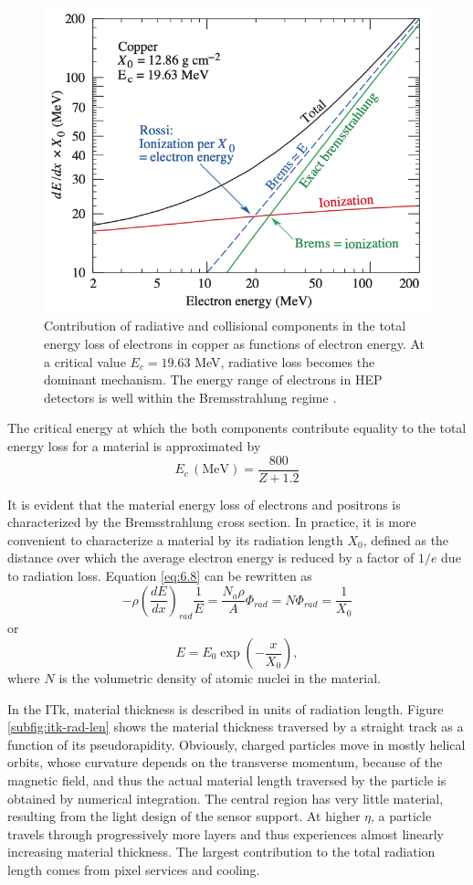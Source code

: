 \begin{figure}[h!]
    \centering
    \includegraphics[width=0.65\linewidth]{figures/rad-vs-col.png}
    \caption{Contribution of radiative and collisional components in the total energy loss of electrons in copper as functions of electron energy. At a critical value $E_c=19.63$ MeV, radiative loss becomes the dominant mechanism. The energy range of electrons in HEP detectors is well within the Bremsstrahlung regime \cite{Zyla:2020zbs}.}
    \label{fig:rad-vs-col}
\end{figure}
The critical energy at which the both components contribute equality to the total energy loss for a material is approximated by 
\begin{equation}
    \label{eq:6.10}
    E_c \,(\mathrm{MeV}) = \frac{800}{Z+1.2}
\end{equation}

It is evident that the material energy loss of electrons and positrons is characterized by the Bremsstrahlung cross section. 
In practice, it is more convenient to characterize a material by its radiation length $X_0$, defined as the distance over which the average electron energy is reduced by a factor of $1/e$ due to radiation loss. 
Equation \eqref{eq:6.8} can be rewritten as 
\begin{equation}
    \label{6.11}
    - \rho\left( \frac{dE}{dx}\right)_{rad} \frac{1}{E} = \frac{N_a\rho}{A} \Phi_{rad} = N\Phi_{rad} = \frac{1}{X_0}
\end{equation}
or 
\begin{equation}
    \label{eq:6.12}
    \boxed{E = E_0 \exp\left( -\frac{x}{X_0} \right)},
\end{equation}
where $N$ is the volumetric density of atomic nuclei in the material.

In the ITk, material thickness is described in units of radiation length. 
Figure \ref{subfig:itk-rad-len} shows the material thickness traversed by a straight track as a function of its pseudorapidity. 
Obviously, charged particles move in mostly helical orbits, whose curvature depends on the transverse momentum, because of the magnetic field, and thus the actual material length traversed by the particle is obtained by numerical integration. 
The central region has very little material, resulting from the light design of the sensor support. 
At higher $\eta$, a particle travels through progressively more layers and thus experiences almost linearly increasing material thickness. 
The largest contribution to the total radiation length comes from pixel services and cooling.

